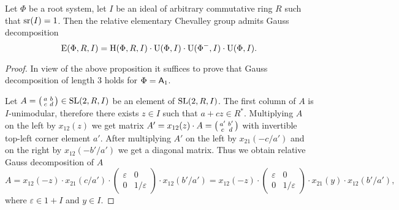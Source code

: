 \begin{lemma}\label{lemma:srRI1}
Let $\Phi$ be a root system, let $I$ be an ideal of arbitrary commutative ring $R$ such that $\operatorname{sr}(I)=1$.
Then the relative elementary Chevalley group admits Gauss decomposition
\[ \operatorname{E}(\Phi,R,I) = \operatorname{H}(\Phi,R,I) \cdot \operatorname{U}(\Phi,I) \cdot \operatorname{U}(\Phi^-,I) \cdot \operatorname{U}(\Phi,I). \]
\end{lemma}
\begin{proof}
In view of the above proposition it suffices to prove that Gauss decomposition of length $3$ holds for $\Phi=\mathsf{A}_1$.

Let $A=\begin{psmallmatrix}a & b \\ c & d\end{psmallmatrix}\in\operatorname{SL}(2,R,I)$ be an element of $\operatorname{SL}(2, R, I)$.
The first column of $A$ is $I$-unimodular, therefore there exists $z\in I$ such that $a+cz\in R^*$.
Multiplying $A$ on the left by $x_{12}(z)$ we get matrix $A'=x_{12}(z)\cdot A=\begin{psmallmatrix}a' & b' \\ c & d\end{psmallmatrix}$ with invertible top-left corner element $a'$.
After multiplying $A'$ on the left by $x_{21}(-c/a')$ and on the right by $x_{12}(-b'/a')$ we get a diagonal matrix. 
Thus we obtain relative Gauss decomposition of $A$
\begin{equation}\nonumber
A=x_{12}(-z)\cdot x_{21}(c/a')\cdot
\begin{pmatrix} \varepsilon & 0 \\ 0 & 1/\varepsilon \end{pmatrix}
\cdot x_{12}(b'/a')=x_{12}(-z)\cdot
\begin{pmatrix} \varepsilon & 0 \\ 0 & 1/\varepsilon \end{pmatrix}
\cdot x_{21}(y) \cdot x_{12}(b'/a'),
\end{equation}
where $\varepsilon\in 1+I$ and $y\in I$. \end{proof}